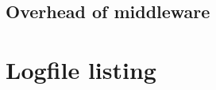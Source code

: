\documentclass[11pt]{article}
\begin{document}
\subsection{Overhead of middleware}



\pagebreak

\section*{Logfile listing}

\end{document}
